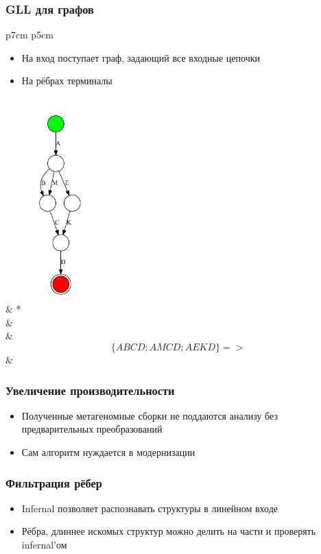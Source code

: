 \documentclass{beamer}
\begin{document}
	\begin{frame}
		\frametitle{GLL для графов}
		\begin{tabular}{p{7cm} p{5cm}}
			\begin{itemize}
				\item На вход поступает граф, задающий все входные цепочки
				\item На рёбрах терминалы
			\end{itemize}
			&
			*{\includegraphics[width=3cm]{pictures/graphGLLexample.pdf}}
			\\ &
			\\ &
			\\ 
			$$
			\{A B C D;
			A M C D;
			A E K D \} =>
			$$ &
		\end{tabular}
	\end{frame}

    \begin{frame}
        \frametitle{Увеличение производительности}
        \begin{itemize}
            \item Полученные метагеномные сборки не поддаются анализу без предварительных преобразований
            \item Сам алгоритм нуждается в модернизации
        \end{itemize}
    \end{frame}

    \begin{frame}
        \frametitle{Фильтрация рёбер}
        \begin{itemize}
            \item Infernal позволяет распознавать структуры в линейном входе
            \item Рёбра, длиннее искомых структур можно делить на части и проверять infernal'ом
        \end{itemize}
    \end{frame}
\end{document}
